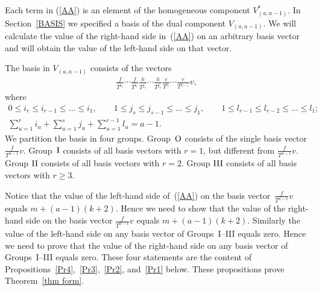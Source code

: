 \documentclass[pdftex]{sigma}
\numberwithin{equation}{section}
\begin{document}
Each term in (\ref{AA}) is an element of the homogeneous component $V^*_{(a,a-1)}$. In Section~\ref{BASIS} we specified a basis of the dual component $V_{(a,a-1)}$. We will calculate the value of the right-hand side in~(\ref{AA}) on an arbitrary basis vector and will obtain the value of the left-hand side on that vector.

The basis in $V_{(a,a-1)}$ consists of the vectors
\begin{gather*}
\frac{f}{T^{i_1}}\cdots\frac{f}{T^{i_r}} \frac{h}{T^{j_1}}\cdots\frac{h}{T^{j_s}} \frac{e}{T^{l_1}}\cdots\frac{e}{T^{l_{r-1}}}v, %
\end{gather*}
where
\begin{gather*}
0\leq i_r\leq i_{r-1}\leq\dots\leq i_1, \qquad 1\leq j_s\leq j_{s-1}\leq\dots\leq j_1,\qquad 1\leq l_{r-1}\leq l_{r-2}\leq\dots\leq l_1;\nonumber\\
 \sum_{u=1}^r i_u + \sum_{u=1}^s j_u + \sum_{u=1}^{r-1} l_u = a-1. %
\end{gather*}
We partition the basis in four groups. Group~${\rm O}$ consists of the single basis vector $\frac{f}{T^{a-1}}v$. Group~${\rm I}$ consists of all basis vectors with $r=1$, but different from $\frac{f}{T^{a-1}}v$. Group ${\rm II}$ consists of all basis vectors with $r=2$. Group ${\rm III}$ consists of all basis vectors with $r\geq 3$.

Notice that the value of the left-hand side of~(\ref{AA}) on the basis vector~$\frac{f}{T^{a-1}}v$ equals $m + (a-1)(k+2)$. Hence we need to show that the value of the right-hand side on the basis vector $\frac{f}{T^{a-1}}v$ equals $m + (a-1)(k+2)$. Similarly the value of the left-hand side on any basis vector of Groups~\mbox{I--III} equals zero. Hence we need
to prove that the value of the right-hand side on any basis vector of Groups~I--III equals zero. These four statements are the content of Propositions~\ref{Pr4},~\ref{Pr3},~\ref{Pr2}, and~\ref{Pr1} below. These propositions prove Theorem~\ref{thm form}.
\end{document}
